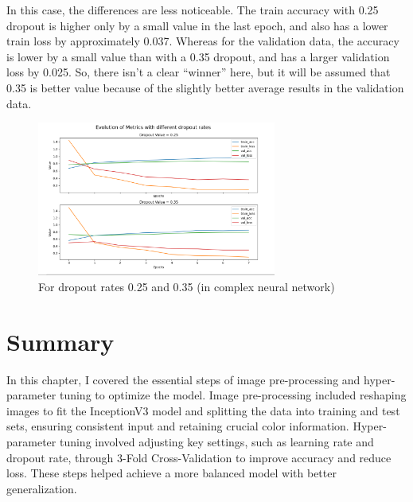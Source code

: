 \begin{enumerate}
\begin{itemize}
     In this case, the differences are less noticeable. The train accuracy with 0.25 dropout is higher only by a small value in the last epoch, and also has a lower train loss by approximately 0.037. Whereas for the validation data, the accuracy is lower by a small value than with a 0.35 dropout, and has a larger validation loss by 0.025. So, there isn’t a clear “winner” here, but it will be assumed that 0.35 is better value because of the slightly better average results in the validation data.
        \begin{figure}[h]
    \centering
    \includegraphics[width=0.7\textwidth]{figures/dropout graph.png}
    \caption{For dropout rates 0.25 and 0.35 (in complex neural network)}
    \label{fig:example_images}
\end{figure}

     

\end{itemize}
    

\end{enumerate}

\section{Summary}
In this chapter, I covered the essential steps of image pre-processing and hyper-parameter tuning to optimize the model. Image pre-processing included reshaping images to fit the InceptionV3 model and splitting the data into training and test sets, ensuring consistent input and retaining crucial color information. Hyper-parameter tuning involved adjusting key settings, such as learning rate and dropout rate, through 3-Fold Cross-Validation to improve accuracy and reduce loss. These steps helped achieve a more balanced model with better generalization.



